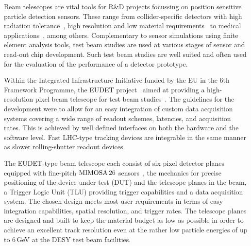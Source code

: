 
Beam telescopes are vital tools for R\&D projects focussing on position sensitive particle detection sensors. 
These range from collider-specific detectors with high radiation tolerance~\cite{1748-0221-9-12-C12001,1748-0221-9-12-C12029},
 high resolution and low material requirements~\cite{1748-0221-10-03-C03044} to medical applications~\cite{Ballabriga2011S15}, among others. 
Complementary to sensor simulations using finite element analysis tools, test beam studies are used at various stages of sensor and read-out chip development. 
Such test beam studies are well suited and often used for the evaluation of the performance of a detector prototype. %

Within the Integrated Infrastructure Initiative funded by the EU in the 6th Framework Programme,
 the EUDET project~\cite{EUDETwp} aimed at providing a high-resolution pixel beam telescope for test beam studies~\cite{ref:eudetreport200902}.
The guidelines for the development were to allow for an easy integration of custom data acquisition systems covering a wide range of readout schemes, latencies, and acquisition rates.
This is achieved by well defined interfaces on both the hardware and the software level. 
Fast LHC-type tracking devices are integrable in the same manner as slower rolling-shutter readout devices. 

The EUDET-type beam telescope each consist of six pixel detector planes equipped with fine-pitch $\textrm{MIMOSA\,26}$ sensors~\cite{HuGuo2010480},
 the mechanics for precise positioning of the device under test (DUT) and the telescope planes in the beam, a Trigger Logic Unit (TLU) providing trigger capabilities and a data acquisition system.
The chosen design meets most user requirements in terms of easy integration capabilities, spatial resolution, and trigger rates. 
The telescope planes are designed and built to keep the material budget as low as possible in order to achieve an excellent track resolution
 even at the rather low particle energies of up to 6\,GeV at the DESY test beam facilities.

